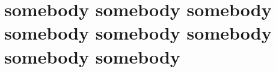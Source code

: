 \documentclass{book}
\begin{document}
 
\tableofcontents 
\chapter{somebody somebody somebody somebody somebody somebody 
somebody somebody} 
\end{document}
